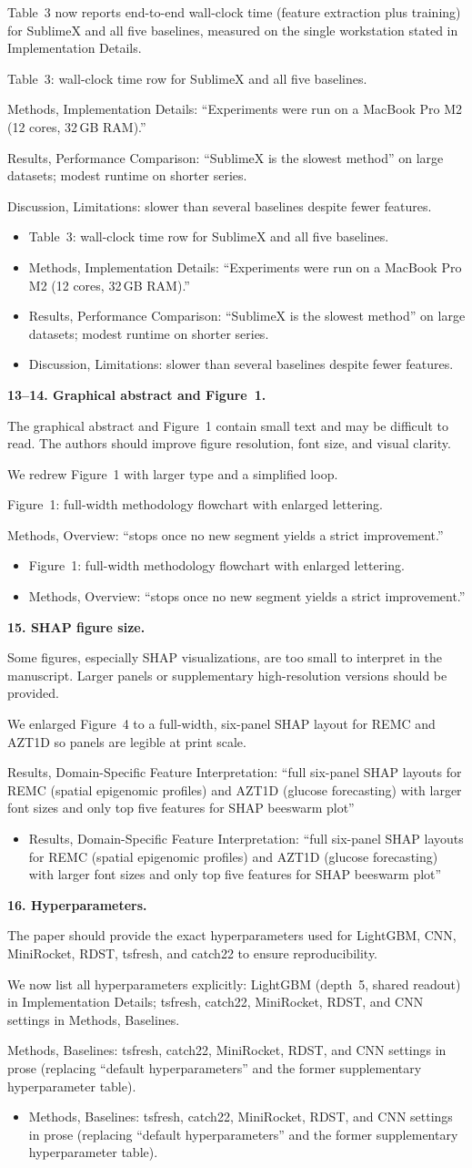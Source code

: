 \documentclass[11pt]{article}
\makeatletter
\newcommand{\rsp}{\par\vspace{0.9em}}
\newcommand{\rcitem}[2]{\begin{reviewerbox}\textbf{#1}\par\smallskip#2\end{reviewerbox}}
\newcommand{\response}[2]{%
  \begin{responsebox}#1%
  \def\@responseitems{#2}%
  \ifx\@responseitems\empty\else\begin{itemize}[nosep,leftmargin=1.2em]#2\end{itemize}\fi
  \end{responsebox}\rsp}
\makeatother
\begin{document}
\response{Table~3 now reports end-to-end wall-clock time (feature extraction plus training) for
SublimeX and all five baselines, measured on the single workstation stated in Implementation
Details.}{
  \item Table~3: wall-clock time row for SublimeX and all five baselines.
  \item Methods, Implementation Details: ``Experiments were run on a MacBook Pro M2 (12 cores,
    32\,GB RAM).''
  \item Results, Performance Comparison: ``SublimeX is the slowest method'' on large datasets;
    modest runtime on shorter series.
  \item Discussion, Limitations: slower than several baselines despite fewer features.
}

\rcitem{13--14. Graphical abstract and Figure~1.}{The graphical abstract and Figure~1 contain
small text and may be difficult to read. The authors should improve figure resolution, font size,
and visual clarity.}

\response{We redrew Figure~1 with larger type and a simplified loop.}{
  \item Figure~1: full-width methodology flowchart with enlarged lettering.
  \item Methods, Overview: ``stops once no new segment yields a strict improvement.''
}

\rcitem{15. SHAP figure size.}{Some figures, especially SHAP visualizations, are too small to
interpret in the manuscript. Larger panels or supplementary high-resolution versions should be
provided.}

\response{We enlarged Figure~4 to a full-width, six-panel SHAP layout for REMC and AZT1D so panels
are legible at print scale. }{
  \item Results, Domain-Specific Feature Interpretation: ``full six-panel SHAP layouts for REMC
    (spatial epigenomic profiles) and AZT1D (glucose forecasting) 
    with larger font sizes and only top five features for SHAP beeswarm plot''
}

\rcitem{16. Hyperparameters.}{The paper should provide the exact hyperparameters used for
LightGBM, CNN, MiniRocket, RDST, tsfresh, and catch22 to ensure reproducibility.}

\response{We now list all hyperparameters explicitly: LightGBM (depth~5, shared readout) in
Implementation Details; tsfresh, catch22, MiniRocket, RDST, and CNN settings in Methods,
Baselines.}{
  \item Methods, Baselines: tsfresh, catch22, MiniRocket, RDST, and CNN settings in prose
    (replacing ``default hyperparameters'' and the former supplementary hyperparameter table).
}
\end{document}
